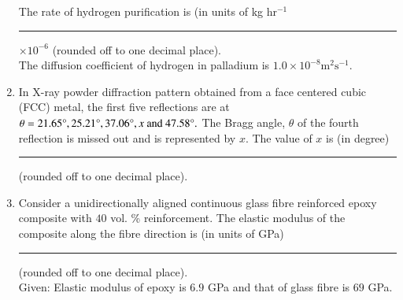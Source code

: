 \documentclass[journal]{IEEEtran}
\begin{document}
\begin{enumerate}[start=40]
The rate of hydrogen purification is (in units of kg  hr$^{-1}$ \rule{1cm}{0.4 pt} $\times 10^{-6}$ (rounded off to one decimal place).\\
The diffusion coefficient of hydrogen in palladium is $1.0 \times 10^{-8} \text{m}^2 \text{s}^{-1}$.

\item In X-ray powder diffraction pattern obtained from a face centered cubic (FCC) metal, the first five reflections are at $\theta = 21.65\degree, 25.21\degree, 37.06\degree , x\text{ and } 47.58\degree.$ The
Bragg angle, $\theta$ of the fourth reflection is missed out and is represented by $x$. The
value of $x$ is (in degree) \rule{1cm}{0.4 pt} (rounded off to one decimal place). 

\item Consider a unidirectionally aligned continuous glass fibre reinforced epoxy
composite with $40$ vol. \%  reinforcement. The elastic modulus of the composite along the fibre direction is (in units of GPa) \rule{1cm}{0.4 pt} (rounded off to one decimal place).\\
Given: Elastic modulus of epoxy is $6.9$ GPa and that of glass fibre is $69$ GPa. 




\end{enumerate}
\end{document}

